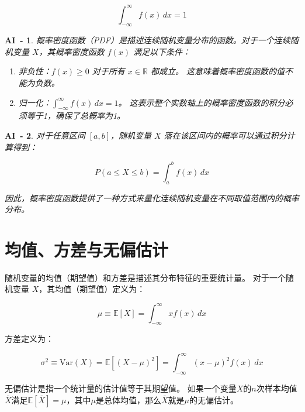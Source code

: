 \documentclass[a4paper]{ctexart}
\newtheorem{AI}{AI~-}
\begin{document}
\begin{equation}
    \int_{-\infty}^{\infty} f(x) \, dx = 1
\end{equation}

\begin{AI}\label{AI:pdf}
    概率密度函数（PDF）是描述连续随机变量分布的函数。对于一个连续随机变量 $X$，其概率密度函数 $f(x)$ 满足以下条件：

    \begin{enumerate}
        \item 非负性：$f(x) \geq 0$ 对于所有 $x \in \mathbb{R}$ 都成立。
              这意味着概率密度函数的值不能为负数。
        \item 归一化：$\int_{-\infty}^{\infty} f(x) \, dx = 1$。
              这表示整个实数轴上的概率密度函数的积分必须等于1，确保了总概率为1。
    \end{enumerate}
\end{AI}

\begin{AI}\label{AI:pdf-cdf}
    对于任意区间 $[a, b]$，随机变量 $X$ 落在该区间内的概率可以通过积分计算得到：

    \begin{equation}
        P(a \leq X \leq b) = \int_{a}^{b} f(x) \, dx
    \end{equation}

    因此，概率密度函数提供了一种方式来量化连续随机变量在不同取值范围内的概率分布。
\end{AI}

\section{均值、方差与无偏估计}

随机变量的均值（期望值）和方差是描述其分布特征的重要统计量。
对于一个随机变量 $X$，其均值（期望值）定义为：

\begin{equation}
    \mu \equiv \mathbb{E}[X] = \int_{-\infty}^{\infty} x f(x) \, dx
\end{equation}

方差定义为：

\begin{equation}
    \sigma^2 \equiv \mathrm{Var}(X) = \mathbb{E}[{(X - \mu)}^2] = \int_{-\infty}^{\infty} {(x - \mu)}^2 f(x) \, dx
\end{equation}

无偏估计是指一个统计量的估计值等于其期望值。
如果一个变量$X$的$n$次样本均值$\bar{X}$满足$\mathbb{E}[\bar{X}] = \mu$，其中$\mu$是总体均值，那么$\bar{X}$就是$\mu$的无偏估计。
\end{document}
